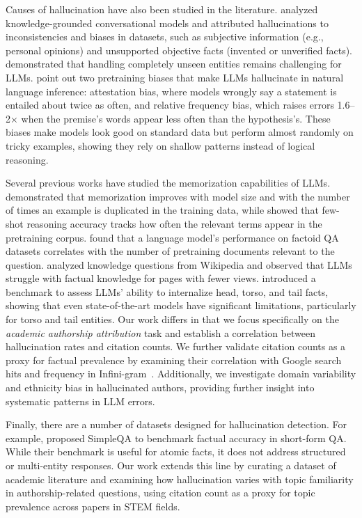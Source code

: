 \documentclass[11pt]{article}
\begin{document}
Causes of hallucination have also been studied in the literature. \citet{dziri2022} analyzed knowledge-grounded conversational models and attributed hallucinations to inconsistencies and biases in datasets, such as subjective information (e.g., personal opinions) and unsupported objective facts (invented or unverified facts). \citet{onoe-etal-2022-entity} demonstrated
that handling completely unseen entities remains
challenging for LLMs. \citet{mckenna2023sourceshallucinationlargelanguage} point out two pretraining biases that make LLMs hallucinate in natural language inference: attestation bias, where models wrongly say a statement is entailed about twice as often, and relative frequency bias, which raises errors 1.6–2× when the premise's words appear less often than the hypothesis's. These biases make models look good on standard data but perform almost randomly on tricky examples, showing they rely on shallow patterns instead of logical reasoning.

Several previous works have studied the memorization capabilities of LLMs. \citet{carlini2022quantifying} demonstrated that memorization improves with model size and with the number of times an example is duplicated in the training data, while \citet{razeghi2022_pretrainingTermFreqFewShot} showed that few-shot reasoning accuracy tracks how often the relevant terms appear in the pretraining corpus. \citet{Kandpal2022_LLMStruggleLongTail} found that a language model's performance on factoid QA datasets correlates with the number of pretraining documents relevant to the question. \citet{mallen2023_whenNotToTrustLMs} analyzed knowledge questions from Wikipedia and observed that LLMs struggle with factual knowledge for pages with fewer views. \citet{sun2024headtotail} introduced a benchmark to assess LLMs' ability to internalize head, torso, and tail facts, showing that even state-of-the-art models have significant limitations, particularly for torso and tail entities. Our work differs in that we focus specifically on the \emph{academic authorship attribution} task and establish a correlation between hallucination rates and citation counts. We further validate citation counts as a proxy for factual prevalence by examining their correlation with Google search hits and frequency in Infini-gram~\citep{Liu2024InfiniGram}. Additionally, we investigate domain variability and ethnicity bias in hallucinated authors, providing further insight into systematic patterns in LLM errors.

Finally, there are a number of datasets designed for hallucination detection. For example, \citet{Wei2024} proposed SimpleQA to benchmark factual accuracy in short-form QA. While their benchmark is useful for atomic facts, it does not address structured or multi-entity responses. Our work extends this line by curating a dataset of academic literature and examining how hallucination varies with topic familiarity in authorship-related questions, using citation count as a proxy for topic prevalence across papers in STEM fields.
\end{document}
